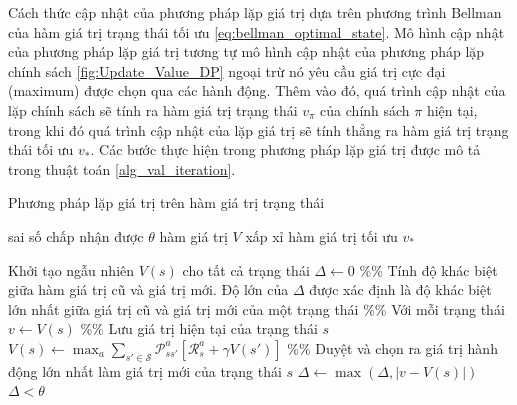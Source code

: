 Cách thức cập nhật của phương pháp lặp giá trị dựa trên phương trình Bellman của hàm giá trị trạng thái tối ưu \ref{eq:bellman_optimal_state}. 
Mô hình cập nhật của phương pháp lặp giá trị tương tự mô hình cập nhật của phương pháp lặp chính sách \ref{fig:Update_Value_DP} ngoại trừ nó yêu cầu giá trị cực đại (maximum) được chọn qua các hành động. 
Thêm vào đó, quá trình cập nhật của lặp chính sách sẽ tính ra hàm giá trị trạng thái $v_{\pi}$ của chính sách $\pi$ hiện tại, trong khi đó quá trình cập nhật của lặp giá trị sẽ tính thẳng ra hàm giá trị trạng thái tối ưu $v_*$. 
Các bước thực hiện trong phương pháp lặp giá trị được mô tả trong thuật toán \ref{alg_val_iteration}.
\begin{algorithm}
	\caption{Phương pháp lặp giá trị trên hàm giá trị trạng thái}
	\label{alg_val_iteration}
	\begin{algorithmic}[1]
		\renewcommand{\algorithmicrequire}{\textbf{Đầu vào:}}
		\renewcommand{\algorithmicensure}{\textbf{Đầu ra:}}
		\algnewcommand{}
		\algnewcommand\Operation{\item[\algorithmicoperation]}
		
		\Require sai số chấp nhận được $\theta$
		\Ensure hàm giá trị $V$ xấp xỉ hàm giá trị tối ưu $v_{*}$
		
		\Operation
		\State Khởi tạo ngẫu nhiên $V(s)$ cho tất cả trạng thái
		\Repeat
		\State $\Delta \leftarrow 0$ \%\% Tính độ khác biệt giữa hàm giá trị cũ và giá trị mới. 
		Độ lớn của $\Delta$ được xác định là độ khác biệt lớn nhất giữa giá trị cũ và giá trị mới của một trạng thái
		 \%\% Với mỗi trạng thái
		\State $v \leftarrow V(s)$ \%\% Lưu giá trị hiện tại của trạng thái $s$
		\State $V(s) \leftarrow \max_{a}\sum_{s' \in \mathcal{S}}\mathcal{P}_{ss'}^{a}\left[\mathcal{R}_{s}^{a} + \gamma V(s')\right]$ \%\% Duyệt và chọn ra giá trị hành động lớn nhất làm giá trị mới của trạng thái $s$
		\State $\Delta \leftarrow \max(\Delta,|v - V(s)|)$
		\EndFor
		\Until $\Delta < \theta$
	\end{algorithmic}
\end{algorithm}

